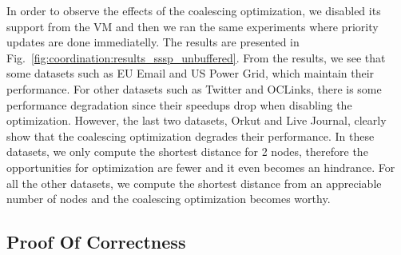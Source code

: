 In order to observe the effects of the coalescing optimization, we disabled its
support from the VM and then we ran the same experiments where priority updates
are done immediatelly. The results are presented in
Fig.~\ref{fig:coordination:results_sssp_unbuffered}. From the results, we see
that some datasets such as EU Email and US Power Grid, which maintain their
performance. For other datasets such as Twitter and OCLinks, there is some
performance degradation since their speedups drop when disabling the
optimization. However, the last two datasets, Orkut and Live Journal, clearly
show that the coalescing optimization degrades their performance. In these
datasets, we only compute the shortest distance for 2 nodes, therefore the
opportunities for optimization are fewer and it even becomes an hindrance. For
all the other datasets, we compute the shortest distance from an appreciable
number of nodes and the coalescing optimization becomes worthy.



\subsection{Proof Of Correctness}


